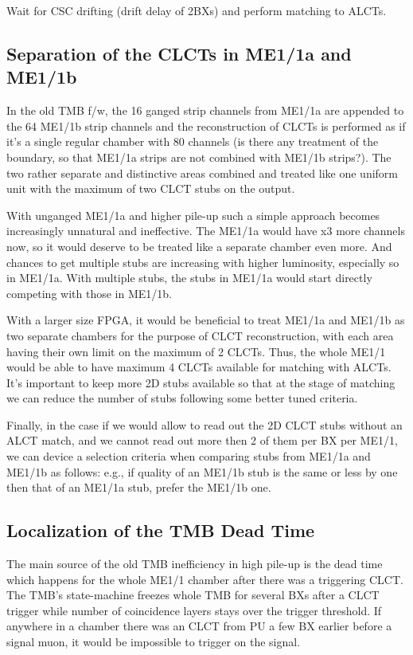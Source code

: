Wait for CSC drifting (drift delay of 2BXs) and perform matching to ALCTs.


\subsection{Separation of the CLCTs in ME1/1a and ME1/1b}

In the old TMB f/w, the 16 ganged strip channels from ME1/1a are appended to the 64 ME1/1b strip channels and the reconstruction of CLCTs is performed as if it's a single regular chamber with 80 channels (is there any treatment of the boundary, so that ME1/1a strips are not combined with ME1/1b strips?). The two rather separate and distinctive areas combined and treated like one uniform unit with the maximum of two CLCT stubs on the output.

With unganged ME1/1a and higher pile-up such a simple approach becomes increasingly unnatural and ineffective. The ME1/1a would have x3 more channels now, so it would deserve to be treated like a separate chamber even more. And chances to get multiple stubs are increasing with higher luminosity, especially so in ME1/1a. With multiple stubs, the stubs in ME1/1a would start directly competing with those in ME1/1b.

With a larger size FPGA, it would be beneficial to treat ME1/1a and ME1/1b as two separate chambers for the purpose of CLCT reconstruction, with each area having their own limit on the maximum of 2 CLCTs. Thus, the whole ME1/1 would be able to have maximum 4 CLCTs available for matching with ALCTs. It's important to keep more 2D stubs available so that at the stage of matching we can reduce the number of stubs following some better tuned criteria.

Finally, in the case if we would allow to read out the 2D CLCT stubs without an ALCT match, and we cannot read out more then 2 of them per BX per ME1/1, we can device a selection criteria when comparing stubs from ME1/1a and ME1/1b as follows: e.g., if quality of an ME1/1b stub is the same or less by one then that of an ME1/1a stub, prefer the ME1/1b one. 

\subsection{Localization of the TMB Dead Time}

 The main source of the old TMB inefficiency in high pile-up is the dead time which happens for the whole ME1/1 chamber after there was a triggering CLCT. The TMB's state-machine freezes whole TMB for several BXs after a CLCT trigger while number of coincidence layers stays over the trigger threshold. If anywhere in a chamber there was an CLCT from PU a few BX earlier before a signal muon, it would be impossible to trigger on the signal.


